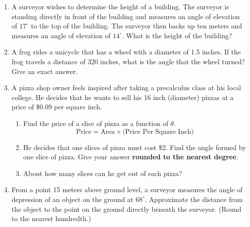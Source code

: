 \begin{enumerate}

  

\item A surveyor wishes to determine the height of a building. The
  surveyor is standing directly in front of the building and measures
  an angle of elevation of $17^\circ$ to the top of the building. The
  surveyor then backs up ten meters and measures an angle of
  elevation of $14^\circ$. What is the height of the building?

  \vfill
  \vfill

\item A frog rides a unicycle that has a wheel with a diameter of 1.5
  inches.  If the frog travels a distance of 320 inches, what is the
  angle that the wheel turned?  Give an exact answer.

  \vfill


\clearpage


\item A pizza shop owner feels inspired after taking a precalculus class at his local college.  He decides that he wants to sell his 16 inch (diameter) pizzas at a price of \$0.09 per square inch.
\begin{enumerate}
\item Find the price of a slice of pizza as a function of $\theta$.
$$\text{Price}=\text{Area}\times \text{(Price Per Square Inch)}$$\vfill
\item He decides that one slices of pizza must cost \$2.  Find the angle formed by one slice of pizza.  Give your answer \textbf{rounded to the nearest degree}.\vfill
\item About how many slices can he get out of each pizza?\vfill

\end{enumerate}




\item From a point 15 meters above ground level, a surveyor measures the angle of depression of an object on the ground at $68^\circ$.  Approximate the distance from the object to the point on the ground directly beneath the surveyor. (Round to the nearest hundredth.) \vfill
\clearpage


\end{enumerate}
